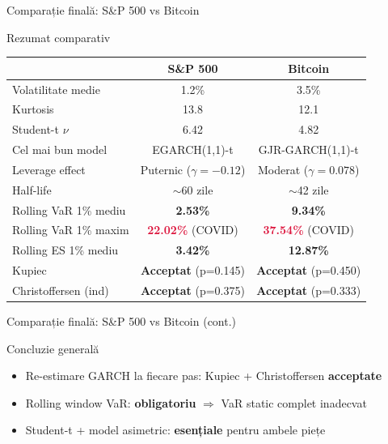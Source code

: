 \documentclass[9pt, aspectratio=169, t]{beamer}
\begin{document}
\begin{frame}{Comparație finală: S\&P 500 vs Bitcoin}
    \small
        \vspace{-0.3cm}
        \begin{block}{Rezumat comparativ}
            \vspace{-0.1cm}
            \begin{center}
            \begin{tabular}{lcc}
                \toprule
                & \textbf{S\&P 500} & \textbf{Bitcoin} \\
                \midrule
                Volatilitate medie & 1.2\% & 3.5\% \\
                Kurtosis & 13.8 & 12.1 \\
                Student-t $\nu$ & 6.42 & 4.82 \\
                Cel mai bun model & EGARCH(1,1)-t & GJR-GARCH(1,1)-t \\
                Leverage effect & Puternic ($\gamma = -0.12$) & Moderat ($\gamma = 0.078$) \\
                Half-life & $\sim$60 zile & $\sim$42 zile \\
                Rolling VaR 1\% mediu & \textcolor{Forest}{\textbf{2.53\%}} & \textcolor{Forest}{\textbf{9.34\%}} \\
                Rolling VaR 1\% maxim & \textcolor{Crimson}{\textbf{22.02\%}} (COVID) & \textcolor{Crimson}{\textbf{37.54\%}} (COVID) \\
                Rolling ES 1\% mediu & \textcolor{Forest}{\textbf{3.42\%}} & \textcolor{Forest}{\textbf{12.87\%}} \\
                Kupiec & \textcolor{Forest}{\textbf{Acceptat}} (p=0.145) & \textcolor{Forest}{\textbf{Acceptat}} (p=0.450) \\
                Christoffersen (ind) & \textcolor{Forest}{\textbf{Acceptat}} (p=0.375) & \textcolor{Forest}{\textbf{Acceptat}} (p=0.333) \\
                \bottomrule
            \end{tabular}
            \end{center}
        \end{block}
\end{frame}

\begin{frame}{Comparație finală: S\&P 500 vs Bitcoin (cont.)}
    \small
        \begin{alertblock}{Concluzie generală}
            \begin{itemize}
                \item Re-estimare GARCH la fiecare pas: Kupiec + Christoffersen \textbf{acceptate}
                \item Rolling window VaR: \textbf{obligatoriu} $\Rightarrow$ VaR static complet inadecvat
                \item Student-t + model asimetric: \textbf{esențiale} pentru ambele piețe
            \end{itemize}
        \end{alertblock}
\end{frame}
\end{document}
